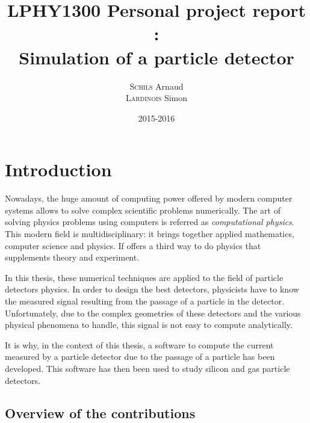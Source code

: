 \documentclass[11pt]{article}
\title{LPHY1300 Personal project report :\\ Simulation of a particle detector}
\author{\textsc{Schils} Arnaud\\ \textsc{Lardinois} Simon}
\date{2015-2016}
\begin{document}
\maketitle
\newpage
\renewcommand{\contentsname}{Table of contents}
\tableofcontents




\newpage
\section*{Introduction}

Nowadays, the huge amount of computing power offered by modern computer systems allows
to solve complex scientific problems numerically. The art of solving physics problems using
computers is referred as \textit{computational physics}. This modern field
is multidisciplinary: it brings together applied mathematics,
computer science and physics. If offers a third way to do physics
that supplements theory and experiment.

In this thesis, these numerical techniques are applied to the field of particle
detectors physics. In order to design the best detectors,
physicists have to know the measured signal resulting from the passage of a particle
in the detector. Unfortunately, due to the complex geometries of these detectors
and the various physical phenomena to handle, this signal is not easy
to compute analytically.

It is why, in the context of this thesis, a software  to compute the current measured
by a particle detector due to the passage of a particle has been developed.
This software has then been used to study silicon and gas particle detectors.


	\subsection*{Overview of the contributions}
\end{document}
